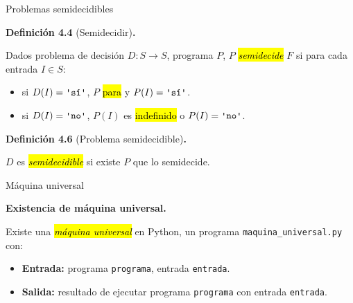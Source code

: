 \documentclass[10pt,xcolor=dvipsnames,aspectratio=169,spanish]{beamer}
\makeatletter
\let\HL\hl
\renewcommand\hl{%
  \let\set@color\beamerorig@set@color
  \let\reset@color\beamerorig@reset@color
  \HL}
\newcommand{\hle}[1]{\hl{\emph{#1}}}
\newcommand{\palabra}[1]{\texttt{\textquotesingle{}{#1}\textquotesingle{}}}
\makeatother
\begin{document}
\begin{frame}{Problemas semidecidibles}

\textbf{Definición 4.4} (Semidecidir)\textbf{.}

Dados problema de decisión $D:S\longrightarrow S$, programa $P$, $P$ \hle{semidecide} $F$ si para cada entrada $I\in S$:

\begin{itemize}
    \item si $D(I)=\palabra{sí}$, $P$ \hl{para} y $P(I)=\palabra{sí}$.
    \item si $D(I)=\palabra{no}$, $P(I)$ es \hl{indefinido} o $P(I)=\palabra{no}$.
\end{itemize}

\vspace{5mm}

\textbf{Definición 4.6} (Problema semidecidible)\textbf{.}

$D$ es \hle{semidecidible} si existe $P$ que lo semidecide.

\end{frame}


\begin{frame}{Máquina universal}

\textbf{Existencia de máquina universal.}

Existe una \hle{máquina universal} en Python, un programa \texttt{maquina\_universal.py} con:

\begin{itemize}
    \item \textbf{Entrada:} programa \texttt{programa}, entrada \texttt{entrada}.
    \item \textbf{Salida:} resultado de ejecutar programa \texttt{programa} con entrada \texttt{entrada}.
\end{itemize}

\end{frame}
\end{document}
